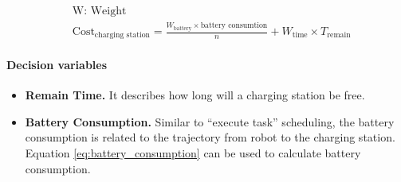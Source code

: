 \begin{equation}	
\label{eq:charging_station_cost}
\begin{aligned}
	& \mbox{W: Weight } \\
	& \mbox{Cost}_{\mbox{charging station}} = \frac{W_{\mbox{battery}} \times \mbox{battery consumtion}}{n} + W_{\mbox{time}} \times T_{\mbox{remain}}
\end{aligned}
\end{equation}


\paragraph{Decision variables}
\begin{itemize}
	\item \textbf{Remain Time.} It describes how long will a charging station be free. 
	\item \textbf{Battery Consumption.} Similar to ``execute task'' scheduling, the battery consumption is related to the trajectory from robot to the charging station. Equation \ref{eq:battery_consumption} can be used to calculate battery consumption.
\end{itemize}

